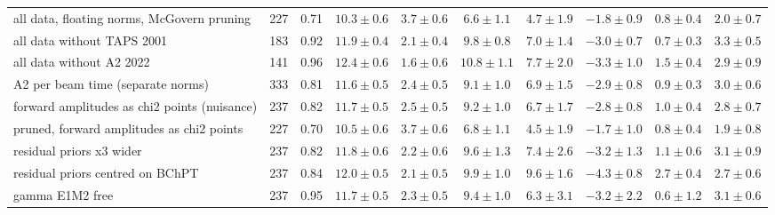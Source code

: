 \begin{tabular}{l r c cccc ccc}
all data, floating norms, McGovern pruning & 227 & 0.71 & $10.3\pm0.6$ & $3.7\pm0.6$ & $6.6\pm1.1$ & $4.7\pm1.9$ & $-1.8\pm0.9$ & $0.8\pm0.4$ & $2.0\pm0.7$\\
all data without TAPS 2001 & 183 & 0.92 & $11.9\pm0.4$ & $2.1\pm0.4$ & $9.8\pm0.8$ & $7.0\pm1.4$ & $-3.0\pm0.7$ & $0.7\pm0.3$ & $3.3\pm0.5$\\
all data without A2 2022 & 141 & 0.96 & $12.4\pm0.6$ & $1.6\pm0.6$ & $10.8\pm1.1$ & $7.7\pm2.0$ & $-3.3\pm1.0$ & $1.5\pm0.4$ & $2.9\pm0.9$\\
A2 per beam time (separate norms) & 333 & 0.81 & $11.6\pm0.5$ & $2.4\pm0.5$ & $9.1\pm1.0$ & $6.9\pm1.5$ & $-2.9\pm0.8$ & $0.9\pm0.3$ & $3.0\pm0.6$\\
forward amplitudes as chi2 points (nuisance) & 237 & 0.82 & $11.7\pm0.5$ & $2.5\pm0.5$ & $9.2\pm1.0$ & $6.7\pm1.7$ & $-2.8\pm0.8$ & $1.0\pm0.4$ & $2.8\pm0.7$\\
pruned, forward amplitudes as chi2 points & 227 & 0.70 & $10.5\pm0.6$ & $3.7\pm0.6$ & $6.8\pm1.1$ & $4.5\pm1.9$ & $-1.7\pm1.0$ & $0.8\pm0.4$ & $1.9\pm0.8$\\
residual priors x3 wider & 237 & 0.82 & $11.8\pm0.6$ & $2.2\pm0.6$ & $9.6\pm1.3$ & $7.4\pm2.6$ & $-3.2\pm1.3$ & $1.1\pm0.6$ & $3.1\pm0.9$\\
residual priors centred on BChPT & 237 & 0.84 & $12.0\pm0.5$ & $2.1\pm0.5$ & $9.9\pm1.0$ & $9.6\pm1.6$ & $-4.3\pm0.8$ & $2.7\pm0.4$ & $2.7\pm0.6$\\
gamma E1M2 free & 237 & 0.95 & $11.7\pm0.5$ & $2.3\pm0.5$ & $9.4\pm1.0$ & $6.3\pm3.1$ & $-3.2\pm2.2$ & $0.6\pm1.2$ & $3.1\pm0.6$\\
\hline
\end{tabular}

